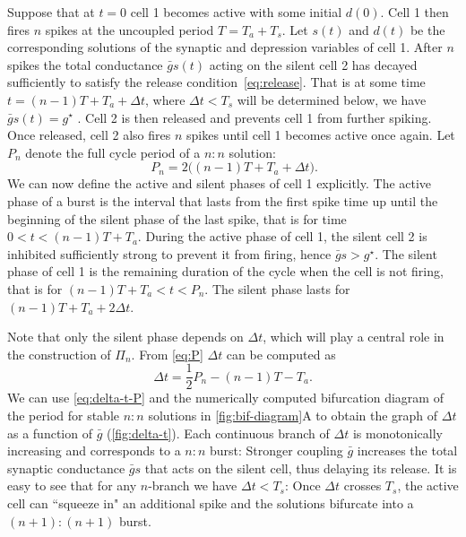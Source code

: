 \documentclass[utf8]{frontiersFPHY} %
\begin{document}
Suppose that at $t=0$ cell 1 becomes active with some initial $d(0)$. Cell 1 then fires $n$ spikes at the uncoupled period $T=T_{a}+T_{s}$.
Let $s(t)$ and $d(t)$ be the corresponding solutions of the synaptic and depression variables of cell 1.
After $n$ spikes the total conductance $\bar g s(t)$ acting on the silent cell 2 has decayed sufficiently to satisfy the release condition~\eqref{eq:release}.
That is at some time $t=(n-1)T + T_{a} + \Delta t$, where $\Delta t < T_{s}$ will be determined below, we have $\bar g s(t)=g^{\star}$ \citep{bose2011}.
Cell 2 is then released and prevents cell 1 from further spiking.
Once released, cell 2 also fires $n$ spikes until cell 1 becomes active once again.
Let $P_n$ denote the full cycle period of a $n:n$ solution:
\begin{equation}
	~\label{eq:P}
	P_n = 2\Big( (n-1)T + T_{a} + \Delta t \Big).
\end{equation}
We can now define the active and silent phases of cell 1 explicitly.
The active phase of a burst is the interval that lasts from the first spike time up until the beginning of the silent phase of the last spike, that is for time $0<t<(n-1)T + T_{a}$.
During the active phase of cell 1, the silent cell 2 is inhibited sufficiently strong to prevent it from firing, hence $\bar g s > g^{\star}$.
The silent phase of cell 1 is the remaining duration of the cycle when the cell is not firing, that is for $(n-1)T + T_{a} < t < P_n$.
The silent phase lasts for $(n-1)T + T_{a} + 2\Delta t$.

Note that only the silent phase depends on $\Delta t$, which will play a central role in the construction of $\Pi_n$.
From \cref{eq:P} $\Delta t$ can be computed as
\begin{equation}
	\label{eq:delta-t-P}
	\Delta t = \frac{1}{2}P_n - (n-1)T - T_{a}.
\end{equation}
We can use \cref{eq:delta-t-P} and the numerically computed bifurcation diagram of the period for stable $n:n$ solutions in \cref{fig:bif-diagram}A to obtain the graph of $\Delta t$ as a function of $\bar g$ (\cref{fig:delta-t}).
Each continuous branch of $\Delta t$ is monotonically increasing and corresponds to a $n:n$ burst:
Stronger coupling $\bar g$ increases the total synaptic conductance $\bar g s$ that acts on the silent cell, thus delaying its release.
It is easy to see that for any $n$-branch we have $\Delta t < T_{s}$:
Once $\Delta t$ crosses $T_{s}$, the active cell can ``squeeze in" an additional spike and the solutions bifurcate into a $(n+1):(n+1)$ burst.
\end{document}
